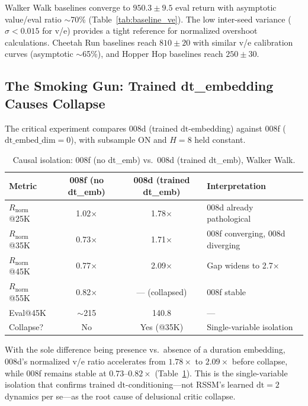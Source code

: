 \documentclass[10pt,letterpaper]{article}
\begin{document}
Walker Walk baselines converge to $950.3 \pm 9.5$ eval return with asymptotic value/eval ratio $\sim$70\% (Table~\ref{tab:baseline_ve}). The low inter-seed variance ($\sigma < 0.015$ for v/e) provides a tight reference for normalized overshoot calculations. Cheetah Run baselines reach $810 \pm 20$ with similar v/e calibration curves (asymptotic $\sim$65\%), and Hopper Hop baselines reach $250 \pm 30$.


\subsection{The Smoking Gun: Trained dt\_embedding Causes Collapse}
\label{sec:smoking_gun}

The critical experiment compares 008d (trained $\mathrm{dt}$-embedding) against 008f ($\mathrm{dt\_embed\_dim}{=}0$), with subsample ON and $H{=}8$ held constant.

\begin{table}[h]
\centering
\caption{Causal isolation: 008f (no dt\_emb) vs.\ 008d (trained dt\_emb), Walker Walk.}
\label{tab:causal_isolation}
\begin{tabular}{lccl}
\toprule
\textbf{Metric} & \textbf{008f (no dt\_emb)} & \textbf{008d (trained dt\_emb)} & \textbf{Interpretation} \\
\midrule
$R_{\text{norm}}$@25K & 1.02$\times$ & 1.78$\times$ & 008d already pathological \\
$R_{\text{norm}}$@35K & 0.73$\times$ & 1.71$\times$ & 008f converging, 008d diverging \\
$R_{\text{norm}}$@45K & 0.77$\times$ & 2.09$\times$ & Gap widens to 2.7$\times$ \\
$R_{\text{norm}}$@55K & 0.82$\times$ & --- (collapsed) & 008f stable \\
Eval@45K & $\sim$215 & 140.8 & --- \\
Collapse? & No & Yes (@35K) & Single-variable isolation \\
\bottomrule
\end{tabular}
\end{table}

With the sole difference being presence vs.\ absence of a duration embedding, 008d's normalized v/e ratio accelerates from $1.78\times$ to $2.09\times$ before collapse, while 008f remains stable at $0.73$--$0.82\times$ (Table~\ref{tab:causal_isolation}). This is the single-variable isolation that confirms trained $\mathrm{dt}$-conditioning---not RSSM's learned $\mathrm{dt}{=}2$ dynamics per se---as the root cause of delusional critic collapse.
\end{document}
